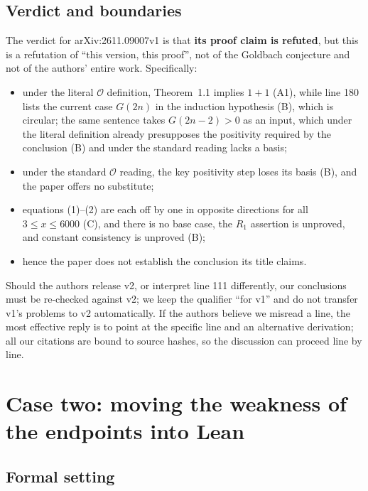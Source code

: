 \documentclass[11pt,a4paper]{article}
\theoremstyle{plain}
\theoremstyle{definition}
\begin{document}
\subsection{Verdict and boundaries}
\label{sec:paper-verdict}

The verdict for arXiv:2611.09007v1 is that \textbf{its proof claim is refuted}, but this is a refutation of ``this version, this proof'', not of the Goldbach conjecture and not of the authors' entire work. Specifically:

\begin{itemize}
\item under the literal $\mathcal O$ definition, Theorem~1.1 implies $1+1$ (A1), while line 180 lists the current case $G(2n)$ in the induction hypothesis (B), which is circular; the same sentence takes $G(2n-2)>0$ as an input, which under the literal definition already presupposes the positivity required by the conclusion (B) and under the standard reading lacks a basis;
\item under the standard $\mathcal O$ reading, the key positivity step loses its basis (B), and the paper offers no substitute;
\item equations (1)--(2) are each off by one in opposite directions for all $3\le x\le6000$ (C), and there is no base case, the $R_1$ assertion is unproved, and constant consistency is unproved (B);
\item hence the paper does not establish the conclusion its title claims.
\end{itemize}

Should the authors release v2, or interpret line 111 differently, our conclusions must be re-checked against v2; we keep the qualifier ``for v1'' and do not transfer v1's problems to v2 automatically. If the authors believe we misread a line, the most effective reply is to point at the specific line and an alternative derivation; all our citations are bound to source hashes, so the discussion can proceed line by line.

\section{Case two: moving the weakness of the endpoints into Lean}
\label{sec:endpoints}

\subsection{Formal setting}
\label{sec:endpoints-setting}
\end{document}
